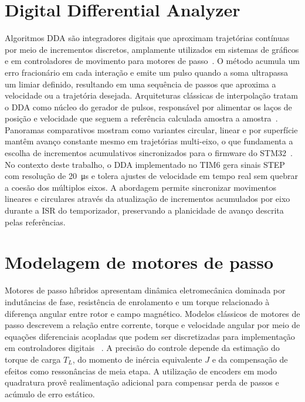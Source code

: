 \section{Digital Differential Analyzer}

Algoritmos DDA são integradores digitais que aproximam trajetórias
contínuas por meio de incrementos discretos, amplamente utilizados em
sistemas de gráficos e em controladores de movimento para motores de
passo~\cite{fussell2003}. O método acumula um erro fracionário em cada
interação e emite um pulso quando a soma ultrapassa um limiar definido,
resultando em uma sequência de passos que aproxima a velocidade ou a
trajetória desejada. Arquiteturas clássicas de interpolação tratam o DDA
como núcleo do gerador de pulsos, responsável por alimentar os laços de
posição e velocidade que seguem a referência calculada amostra a
amostra~\cite{idc_cnc_interp,koren_reference,efficient_reference,unit3_interpolators}.
Panoramas comparativos mostram como variantes circular, linear e por
superfície mantêm avanço constante mesmo em trajetórias multi-eixo, o
que fundamenta a escolha de incrementos acumulativos sincronizados para o
firmware do STM32~\cite{koren_cnc_interpolators}. No contexto deste
trabalho, o DDA implementado no TIM6 gera sinais STEP com resolução de
\SI{20}{\micro\second} e tolera ajustes de velocidade em tempo real sem
quebrar a coesão dos múltiplos eixos. A abordagem permite sincronizar
movimentos lineares e circulares através da atualização de incrementos
acumulados por eixo durante a ISR do temporizador, preservando a
planicidade de avanço descrita pelas referências.

\section{Modelagem de motores de passo}

Motores de passo híbridos apresentam dinâmica eletromecânica dominada
por indutâncias de fase, resistência de enrolamento e um torque
relacionado à diferença angular entre rotor e campo magnético. Modelos
clássicos de motores de passo descrevem a relação entre corrente,
torque e velocidade angular por meio de equações diferenciais acopladas
que podem ser discretizadas para implementação em controladores digitais
~\cite{kenjo1994}. A precisão do controle depende da estimação do torque
de carga $T_L$, do momento de inércia equivalente $J$ e da compensação
de efeitos como ressonâncias de meia etapa. A utilização de encoders em
modo quadratura provê realimentação adicional para compensar perda de
passos e acúmulo de erro estático.


